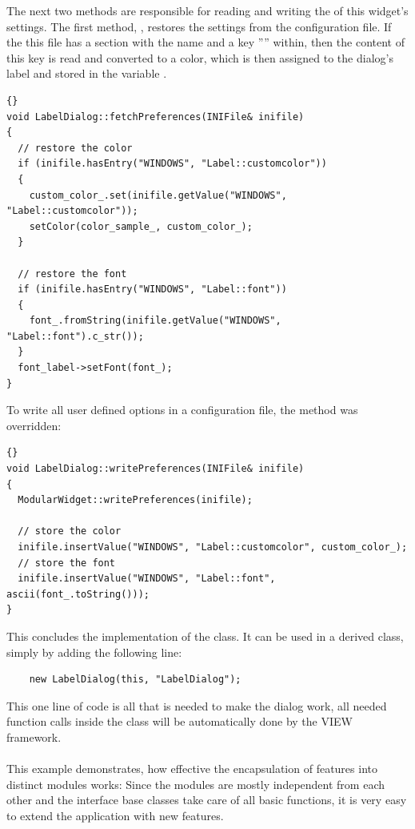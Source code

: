 The next two methods are responsible for reading and writing the of this widget's settings.
The first method, , restores the settings from the configuration file.
If the this file has a section with the name  and a key 
'''' within, then the content of this key is read and converted 
to a color, which is then assigned to the dialog's label and stored in the variable
.
\begin{lstlisting}{}
void LabelDialog::fetchPreferences(INIFile& inifile)
{
  // restore the color 
  if (inifile.hasEntry("WINDOWS", "Label::customcolor"))
  {
    custom_color_.set(inifile.getValue("WINDOWS", "Label::customcolor"));
    setColor(color_sample_, custom_color_);
  }

  // restore the font
  if (inifile.hasEntry("WINDOWS", "Label::font"))
  {
    font_.fromString(inifile.getValue("WINDOWS", "Label::font").c_str());
  }
  font_label->setFont(font_);
}
\end{lstlisting}

\vspace{0.3cm}
To write all user defined options in a configuration file, the method
 was overridden:
\begin{lstlisting}{}
void LabelDialog::writePreferences(INIFile& inifile)
{
  ModularWidget::writePreferences(inifile);

  // store the color
  inifile.insertValue("WINDOWS", "Label::customcolor", custom_color_);
  // store the font
  inifile.insertValue("WINDOWS", "Label::font", ascii(font_.toString()));
}
\end{lstlisting}

This concludes the implementation of the  class. 
It can be used in a derived  class, simply by adding the following line: 
\begin{verbatim}
	new LabelDialog(this, "LabelDialog");
\end{verbatim}
This one line of code is all that is needed to make the dialog work, all needed function 
calls inside the  class will be automatically done by the VIEW framework.
\\
\\
This example demonstrates, how effective the encapsulation of features into distinct
modules works: Since the modules are mostly independent from each other and the interface
base classes take care of all basic functions, it is very easy to extend the application
with new features.


